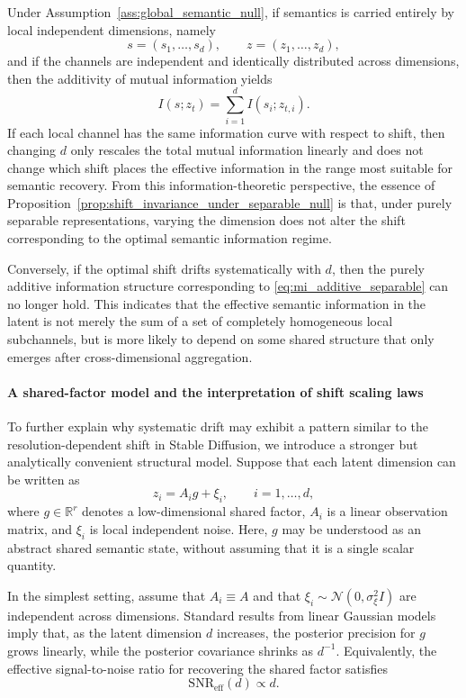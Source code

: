 Under Assumption~\ref{ass:global_semantic_null}, if semantics is carried entirely by local independent dimensions, namely
\[
s=(s_1,\dots,s_d),\qquad z=(z_1,\dots,z_d),
\]
and if the channels are independent and identically distributed across dimensions, then the additivity of mutual information yields
\begin{equation}
I(s;z_t)=\sum_{i=1}^{d} I(s_i;z_{t,i}).
\label{eq:mi_additive_separable}
\end{equation}
If each local channel has the same information curve with respect to shift, then changing $d$ only rescales the total mutual information linearly and does not change which shift places the effective information in the range most suitable for semantic recovery. From this information-theoretic perspective, the essence of Proposition~\ref{prop:shift_invariance_under_separable_null} is that, under purely separable representations, varying the dimension does not alter the shift corresponding to the optimal semantic information regime.

Conversely, if the optimal shift drifts systematically with $d$, then the purely additive information structure corresponding to \eqref{eq:mi_additive_separable} can no longer hold. This indicates that the effective semantic information in the latent is not merely the sum of a set of completely homogeneous local subchannels, but is more likely to depend on some shared structure that only emerges after cross-dimensional aggregation.

\paragraph{A shared-factor model and the interpretation of shift scaling laws}

To further explain why systematic drift may exhibit a pattern similar to the resolution-dependent shift in Stable Diffusion, we introduce a stronger but analytically convenient structural model. Suppose that each latent dimension can be written as
\begin{equation}
z_i=A_i g+\xi_i,
\qquad i=1,\dots,d,
\label{eq:shared_factor_model}
\end{equation}
where $g\in\mathbb R^r$ denotes a low-dimensional shared factor, $A_i$ is a linear observation matrix, and $\xi_i$ is local independent noise. Here, $g$ may be understood as an abstract shared semantic state, without assuming that it is a single scalar quantity.

In the simplest setting, assume that $A_i\equiv A$ and that $\xi_i\sim\mathcal N(0,\sigma_{\xi}^2 I)$ are independent across dimensions. Standard results from linear Gaussian models imply that, as the latent dimension $d$ increases, the posterior precision for $g$ grows linearly, while the posterior covariance shrinks as $d^{-1}$. Equivalently, the effective signal-to-noise ratio for recovering the shared factor satisfies
\begin{equation}
\mathrm{SNR}_{\mathrm{eff}}(d)\propto d.
\label{eq:effective_snr_shared_factor}
\end{equation}

